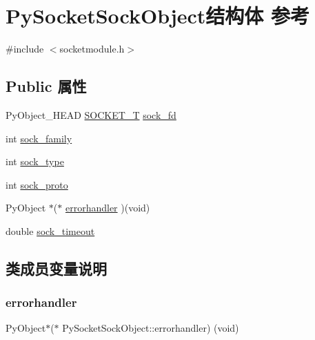 \hypertarget{struct_py_socket_sock_object}{}\section{Py\+Socket\+Sock\+Object结构体 参考}
\label{struct_py_socket_sock_object}


{\ttfamily \#include $<$socketmodule.\+h$>$}

\subsection*{Public 属性}
\begin{DoxyCompactItemize}
\item 
Py\+Object\+\_\+\+H\+E\+AD \mbox{\hyperlink{socketmodule_8h_a6d6654fe512b6aa06d63667475d56ed7}{S\+O\+C\+K\+E\+T\+\_\+T}} \mbox{\hyperlink{struct_py_socket_sock_object_a84f8e2db17ba0c20ab0a18076bd698bf}{sock\+\_\+fd}}
\item 
int \mbox{\hyperlink{struct_py_socket_sock_object_a61eba45f8cd792c1c0b353d58691850d}{sock\+\_\+family}}
\item 
int \mbox{\hyperlink{struct_py_socket_sock_object_a396c2c7cc92df8e9c16edc9a0268ca10}{sock\+\_\+type}}
\item 
int \mbox{\hyperlink{struct_py_socket_sock_object_a0987b1ba618b08bd9ee6386965a8656e}{sock\+\_\+proto}}
\item 
Py\+Object $\ast$($\ast$ \mbox{\hyperlink{struct_py_socket_sock_object_a9f42be5258055a3728274d949ee31ea3}{errorhandler}} )(void)
\item 
double \mbox{\hyperlink{struct_py_socket_sock_object_a50b3ca5f0fb5301f74cc4de9ebd637f9}{sock\+\_\+timeout}}
\end{DoxyCompactItemize}


\subsection{类成员变量说明}
\mbox{\label{struct_py_socket_sock_object_a9f42be5258055a3728274d949ee31ea3}} 
\subsubsection{\texorpdfstring{errorhandler}{errorhandler}}
{\footnotesize\ttfamily Py\+Object$\ast$($\ast$ Py\+Socket\+Sock\+Object\+::errorhandler) (void)}

